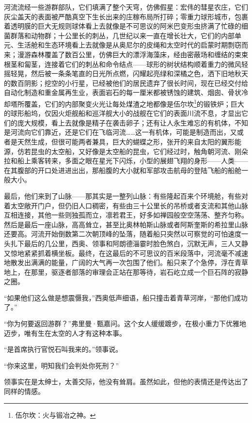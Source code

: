 \documentclass[AutoFakeBold=true]{book}
\begin{document}
河流流经一些游群部队，它们填满了整个天穹，仿佛假星：宏伟的彗星农庄，它们灰尘盖天的表面被严酷真空下生长出来的庄稼布局所打碎；零重力球形城市，包裹着透明膜的巨大无规则球体看上去就像是不可思议的阿米巴变形虫挤满了忙碌的细菌群落和动物群；十公里长的刺丛，几世纪以来一直在增长壮大，它们的内部单元、生活舱和生态环境看上去就像是从奥尼尔的皮绳和太空时代的启蒙时期剽窃而来；漫游森林覆盖了数百公里，仿佛巨大的漂浮海藻床，经由密蔽场和缠结的束束根茎和匐茎，连接着它们的刺丛和命令结点——球形的树状结构顺着重力的微风轻摇轻晃，然后被一条条笔直的日光所点燃，闪耀起亮绿和深橘之色，洒下旧地秋天的数百阴影；挖空的小行星，已经被他们的居民遗弃了很长时间，现在已经交付给自动化制造和重金属再生业，表面岩石的每一厘米都被锈蚀的建筑、烟囱、骨状冷却塔所覆盖，它们的内部聚变火光让每处煤渣之地都像是伍尔坎\footnote{伍尔坎：火与锻冶之神。}的锻铁炉；巨大的球形船坞，仅因火炬舰船和巡洋舰大小的战舰在它们的表面川流不息，才显出它们的庞大规模，看上去就像是精子在袭击卵子；还有让人永生难忘的有机体，不知是河流向它们靠近，还是它们在飞临河流……这一有机体，可能是制造而出，又或者是天然生成，但很可能两者兼具，巨大的蝴蝶之形，张开的来自太阳的翼形能源，仿若昆虫的太空船，又好像是太空船的昆虫，它们经过时，触角朝河流、刚朵拉和船上乘客转来，多面之眼在星光下闪烁，小型的展翅飞翔的身形——人类——在其腹部的开口处进进出出，那船腹的大小就和军部攻击航母的登陆飞船的船舱一般大小。

最后，他们来到了山脉——那其实是一整列山脉：有些隆起百来个环境舱，有些对着太空敞开门户，但仍旧人口稠密，有些由三十公里长的吊桥或者支流和其他山脉互相连接，其他一些则独孤而立，凛若君王，好多如禅园般空空荡荡、整齐匀称。然后是最后一座山脉，高高耸立，甚至比奥林帕斯山脉或者阿斯奎斯的希拉里山脉还要高。河流开始倒数第二次朝顶峰的坠落，随着船只突然以可察觉的可怕速度一头扎下最后的几公里，西奥、领事和阿朗德淄霎时脸色煞白，沉默无声，三人又静又惊地紧紧抓着横坐板。最终，在这最后的不可思议的百米段落中，河流毫不减速地散发出满满的能量，广阔的大气再一次包围了他们。船只来了个急停，浮在青草地上，在那里，驱逐者部落的审理会正站在那等待，岩石屹立成一个巨石阵的寂静之圈。

``如果他们这么做是想震慑我，''西奥低声细语，船只撞击着青草河岸，``那他们成功了。''

\vspace*{1em}

``你为何要返回游群？''弗里曼·甄嘉问。这个女人缓缓踱步，在极小重力下优雅地迈步，唯有生在太空的人才有这种本事。

``是首席执行官悦石叫我来的。''领事说。

``你来这里，明知我们会判处你死刑？''

领事实在是太绅士，太善交际，他没有耸肩。虽然如此，但他的表情还是传达出了同样的情感。
\end{document}

